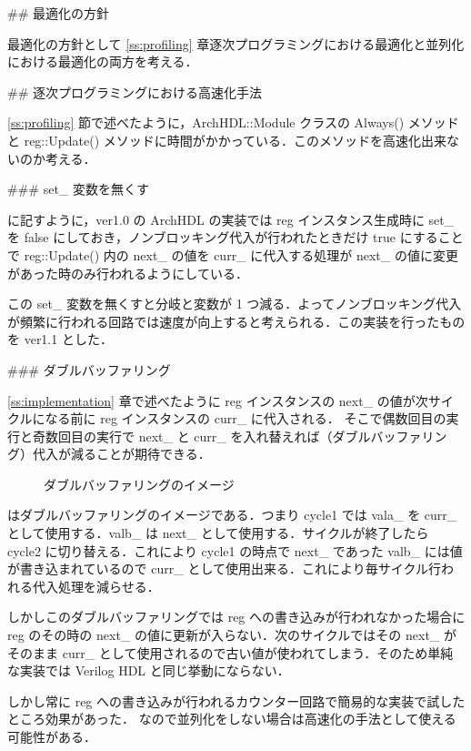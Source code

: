 ## 最適化の方針

最適化の方針として \ref{ss:profiling} 章逐次プログラミングにおける最適化と並列化における最適化の両方を考える．


## 逐次プログラミングにおける高速化手法

\ref{ss:profiling} 節で述べたように，ArchHDL::Module クラスの Always() メソッドと
reg::Update() メソッドに時間がかかっている．このメソッドを高速化出来ないのか考える．


### set_ 変数を無くす \label{s:no_set}

 に記すように，ver1.0 の ArchHDL の実装では reg インスタンス生成時に set_ を false
にしておき，ノンブロッキング代入が行われたときだけ true にすることで
reg::Update() 内の next_ の値を curr_
に代入する処理が next_ の値に変更があった時のみ行われるようにしている．

この set_ 変数を無くすと分岐と変数が 1 つ減る．よってノンブロッキング代入が頻繁に行われる回路では速度が向上すると考えられる．この実装を行ったものを ver1.1 とした．



### ダブルバッファリング

\ref{ss:implementation} 章で述べたように
reg インスタンスの next_ の値が次サイクルになる前に reg インスタンスの curr_ に代入される．
そこで偶数回目の実行と奇数回目の実行で next_ と curr_
を入れ替えれば（ダブルバッファリング）代入が減ることが期待できる．

\begin{figure}[t]
 \begin{center}
  
 \end{center}
 \caption{ダブルバッファリングのイメージ}
 \label{fig:double_buffer}
\end{figure}

 はダブルバッファリングのイメージである．つまり cycle1 では vala_ を curr_ として使用する．valb_ は next_ として使用する．サイクルが終了したら cycle2 に切り替える．これにより cycle1 の時点で next_ であった valb_ には値が書き込まれているので curr_ として使用出来る．これにより毎サイクル行われる代入処理を減らせる．

しかしこのダブルバッファリングでは reg への書き込みが行われなかった場合に
reg のその時の next_ の値に更新が入らない．次のサイクルではその next_ がそのまま
curr_ として使用されるので古い値が使われてしまう．そのため単純な実装では Verilog HDL と同じ挙動にならない．

しかし常に reg への書き込みが行われるカウンター回路で簡易的な実装で試したところ効果があった．
なので並列化をしない場合は高速化の手法として使える可能性がある．

